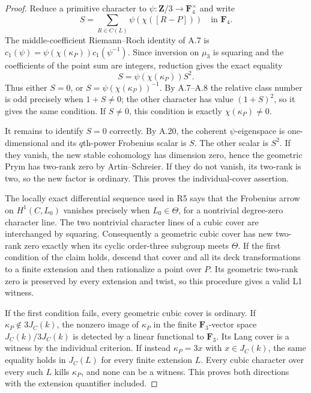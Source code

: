 \documentclass[11pt]{article}
\begin{document}
\begin{proof}
Reduce a primitive character to $\psi:\mathbf Z/3\to\mathbf F_4^\times$
and write
\[
                 S=\sum_{R\in C(L)}\psi(\chi([R-P]))
                         \quad\text{in }\mathbf F_4.
\]
The middle-coefficient Riemann--Roch identity of A.7 is
$c_1(\psi)=\psi(\chi(\kappa_P))c_1(\psi^{-1})$.
Since inversion on $\mu_3$ is squaring and the coefficients of the
point sum are integers, reduction gives the exact equality
\[
                    S=\psi(\chi(\kappa_P))S^2.          \tag{A.16}
\]
Thus either $S=0$, or $S=\psi(\chi(\kappa_P))^{-1}$.
By A.7--A.8 the relative class number is odd precisely when
$1+S\ne0$; the other character has value $(1+S)^2$, so it gives the
same condition.  If $S\ne0$, this condition is exactly
$\chi(\kappa_P)\ne0$.

It remains to identify $S=0$ correctly.  By A.20, the coherent
$\psi$-eigenspace is one-dimensional and its $q$th-power Frobenius
scalar is $S$.  The other scalar is $S^2$.
If they vanish, the new stable cohomology has dimension zero, hence
the geometric Prym has two-rank zero by Artin--Schreier.  If they do
not vanish, its two-rank is two, so the new factor is ordinary.
This proves the individual-cover assertion.

The locally exact differential sequence used in R5 says that the
Frobenius arrow on $H^1(C,L_0)$ vanishes precisely when
$L_0\in\Theta$, for a nontrivial degree-zero character line.
The two nontrivial character lines of a cubic cover are interchanged
by squaring.  Consequently a geometric cubic cover has new two-rank
zero exactly when its cyclic order-three subgroup meets $\Theta$.
If the first condition of the claim holds, descend that cover and all
its deck transformations to a finite extension and then rationalize
a point over $P$.  Its geometric two-rank zero is preserved by every
extension and twist, so this procedure gives a valid L1 witness.

If the first condition fails, every geometric cubic cover is ordinary.
If $\kappa_P\notin3J_C(k)$, the nonzero image of $\kappa_P$ in the
finite $\mathbf F_3$-vector space $J_C(k)/3J_C(k)$ is detected by a
linear functional to $\mathbf F_3$.  Its Lang cover is a witness by
the individual criterion.  If instead $\kappa_P=3x$ with $x\in J_C(k)$,
the same equality holds in $J_C(L)$ for every finite extension $L$.
Every cubic character over every such $L$ kills $\kappa_P$, and none
can be a witness.  This proves both directions with the extension
quantifier included.
\end{proof}
\end{document}
